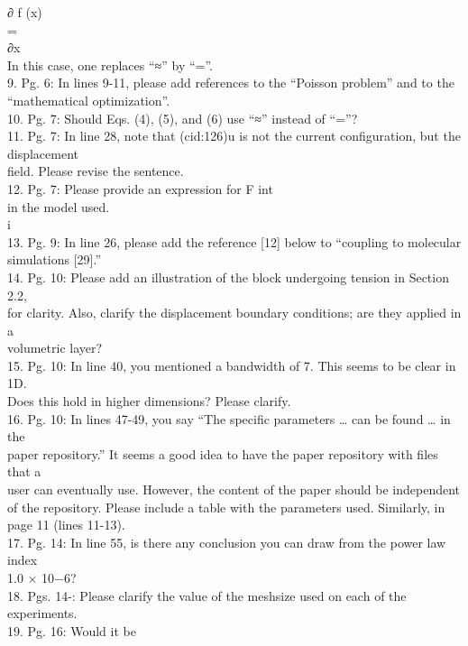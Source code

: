 ∂ f (x) \\= \\∂x \\In this case, one replaces ``≈'' by ``=''. \\9. Pg.
6: In lines 9-11, please add references to the ``Poisson problem'' and
to the \\``mathematical optimization''. \\10. Pg. 7: Should Eqs. (4),
(5), and (6) use ``≈'' instead of ``=''? \\11. Pg. 7: In line 28, note
that (cid:126)u is not the current conﬁguration, but the displacement
\\ﬁeld. Please revise the sentence. \\12. Pg. 7: Please provide an
expression for F int \\in the model used. \\i \\13. Pg. 9: In line 26,
please add the reference {[}12{]} below to ``coupling to molecular
\\simulations {[}29{]}.'' \\14. Pg. 10: Please add an illustration of
the block undergoing tension in Section 2.2, \\for clarity. Also,
clarify the displacement boundary conditions; are they applied in a
\\volumetric layer? \\15. Pg. 10: In line 40, you mentioned a bandwidth
of 7. This seems to be clear in 1D. \\Does this hold in higher
dimensions? Please clarify. \\16. Pg. 10: In lines 47-49, you say ``The
speciﬁc parameters \ldots{} can be found \ldots{} in the \\paper
repository.'' It seems a good idea to have the paper repository with
ﬁles that a \\user can eventually use. However, the content of the paper
should be independent \\of the repository. Please include a table with
the parameters used. Similarly, in \\page 11 (lines 11-13). \\17. Pg.
14: In line 55, is there any conclusion you can draw from the power law
index \\1.0 × 10−6? \\18. Pgs. 14-: Please clarify the value of the
meshsize used on each of the experiments. \\19. Pg. 16: Would it be
